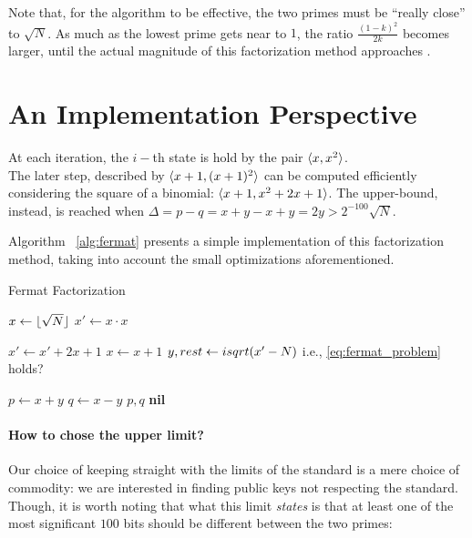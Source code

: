 \begin{remark}
  Note that, for the algorithm to be effective, the two primes must be
  ``really close'' to $\sqrt{N}$. As much as the lowest prime gets near to
  $1$, the ratio $\frac{(1-k)^2}{2k}$ becomes larger, until the actual magnitude
  of this factorization method approaches .
\end{remark}

\section{An Implementation Perspective \label{sec:fermat:implementation}}

At each iteration, the $i-$th state is hold by the pair $\langle x, x^2\rangle$.\\
The later step, described by $\langle x+1, (x+1)^2\rangle$ can be computed efficiently
considering the square of a binomial: $\langle x+1, x^2 + 2x + 1\rangle$.
The upper-bound, instead, is reached when
$ \Delta = p - q  = x + y - x + y = 2y > 2^{-100}\sqrt{N}$.

Algorithm ~\ref{alg:fermat} presents a simple implementation of this
factorization method, taking into account the small optimizations
aforementioned.

\begin{algorithm}[H]
  \caption{Fermat Factorization \label{alg:fermat}}
  \begin{algorithmic}[1]
    \State $x \gets \lfloor\sqrt{N}\rfloor$
    \State $x' \gets x \cdot x$

    \Repeat
    \State $x' \gets x' + 2x + 1$
    \State $x \gets x+1$
    \State $y, rest \gets isqrt(x' - N)$
    \Comment i.e., \ref{eq:fermat_problem} holds?

    \State $p \gets x+y$
    \State $q \gets x-y$
    \State \Return $p, q$
    \Else
    \State \Return \textbf{nil}
    \EndIf
    \EndFunction
    \end{algorithmic}
\end{algorithm}

\paragraph{How to chose the upper limit?}  Our choice of keeping straight with
the limits of the standard is a mere choice of commodity: we are interested in
finding public keys  not respecting the standard.
Though, it is worth noting that what this limit \emph{states} is that at least
one of the most significant $100$ bits should be different between the two
primes:

